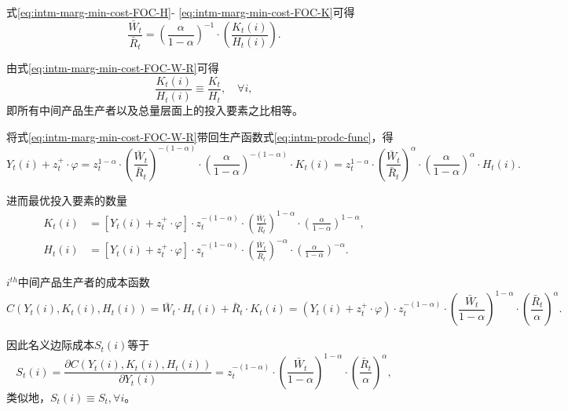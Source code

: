 式\eqref{eq:intm-marg-min-cost-FOC-H}-  \eqref{eq:intm-marg-min-cost-FOC-K}可得
\begin{equation}
  \label{eq:intm-marg-min-cost-FOC-W-R}
  \frac{\bar{W}_t}{\bar{R}_t} = \left(\frac{\alpha}{1-\alpha}\right)^{-1} \cdot \left(\frac{K_{t}(i)}{H_{t}(i)}\right).
\end{equation}

由式\eqref{eq:intm-marg-min-cost-FOC-W-R}可得 \begin{equation}
\label{eq:intm-homo-K-H-no-i} \frac{K_t(i)}{H_{t}(i)} \equiv \frac{K_t}{H_t},
\quad \forall i, \end{equation} 即所有中间产品生产者以及总量层面上的投入要素之比相等。

将式\eqref{eq:intm-marg-min-cost-FOC-W-R}带回生产函数式\eqref{eq:intm-prodc-func}，得
\begin{equation*}
  Y_t(i) + z_t^+ \cdot \varphi
= z_t^{1-\alpha} \cdot \left(\frac{\bar{W}_t}{\bar{R}_t}\right)^{-(1-\alpha)} \cdot \left( \frac{\alpha}{1-\alpha} \right)^{-(1-\alpha)} \cdot K_{t}(i)
= z_t^{1-\alpha} \cdot \left(\frac{\bar{W}_t}{\bar{R}_t}\right)^{\alpha} \cdot \left( \frac{\alpha}{1-\alpha} \right)^{\alpha} \cdot H_{t}(i).
\end{equation*}

进而最优投入要素的数量
\begin{align*}
  K_t(i) &= \left[ Y_t(i) + z_t^+ \cdot \varphi \right] \cdot z_t^{-(1-\alpha)} \cdot \left(\frac{\bar{W}_t}{\bar{R}_t}\right)^{1-\alpha} \cdot \left( \frac{\alpha}{1-\alpha} \right)^{1-\alpha}, \\
  H_t(i) &= \left[ Y_t(i) + z_t^+ \cdot \varphi \right] \cdot z_t^{-(1-\alpha)} \cdot \left(\frac{\bar{W}_t}{\bar{R}_t}\right)^{-\alpha} \cdot \left( \frac{\alpha}{1-\alpha} \right)^{-\alpha}.
\end{align*}

$i^{th}$中间产品生产者的成本函数
\begin{equation}
  \label{eq:intm-prodc-cost}
  C(Y_t(i),K_t(i),H_t(i)) =\bar{W}_t \cdot H_t(i) + \bar{R}_t \cdot K_{t}(i) = \left(Y_t(i) + z_t^+ \cdot \varphi \right) \cdot z_t^{-(1-\alpha)} \cdot \left(\frac{\bar{W}_t}{1-\alpha}\right)^{1-\alpha} \cdot \left(\frac{\bar{R}_t}{\alpha}\right)^{\alpha}.
\end{equation}

因此名义边际成本$S_t(i)$等于
\begin{equation}
  \label{eq:intm-nominal-marg-cost}
  S_t(i) = \frac{\partial C(Y_t(i),K_t(i),H_t(i))}{\partial Y_t(i)} = z_t^{-(1-\alpha)} \cdot \left(\frac{\bar{W}_t}{1-\alpha}\right)^{1-\alpha} \cdot \left(\frac{\bar{R}_t}{\alpha}\right)^{\alpha},
\end{equation}
类似地，$S_t(i) \equiv S_t, \forall i$。

